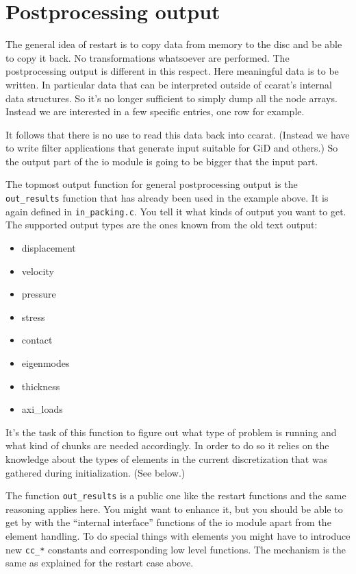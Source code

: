 \section{Postprocessing output}

The general idea of restart is to copy data from memory to the disc
and be able to copy it back. No transformations whatsoever are performed.
The postprocessing output is different in this respect. Here meaningful
data is to be written. In particular data that can be interpreted
outside of ccarat's internal data structures. So it's no longer sufficient
to simply dump all the node arrays. Instead we are interested in a
few specific entries, one row for example.

It follows that there is no use to read this data back into ccarat.
(Instead we have to write filter applications that generate input
suitable for GiD and others.) So the output part of the io module
is going to be bigger that the input part.

The topmost output function for general postprocessing output is the
\texttt{out{\_}results} function that has already been used in the
example above. It is again defined in \texttt{in{\_}packing.c}.
You tell it what kinds of output you want to get. The supported output
types are the ones known from the old text output: 

\begin{itemize}
\item {} displacement
\item {} velocity
\item {} pressure
\item {} stress
\item {} contact
\item {} eigenmodes
\item {} thickness
\item {} axi{\_}loads
\end{itemize}
It's the task of this function to figure out what type of problem
is running and what kind of chunks are needed accordingly. In order
to do so it relies on the knowledge about the types of elements in
the current discretization that was gathered during initialization.
(See below.)

The function \texttt{out{\_}results} is a public one like the restart
functions and the same reasoning applies here. You might want to enhance
it, but you should be able to get by with the {}``internal interface''
functions of the io module apart from the element handling. To do
special things with elements you might have to introduce new \texttt{cc{\_}{*}}
constants and corresponding low level functions. The mechanism is
the same as explained for the restart case above.


